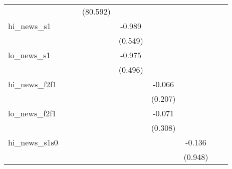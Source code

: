 {\begin{tabular}{l*{8}{c}}
            &                     &                     &    (80.592)         &                     &                     &                     &                     &                     \\
\addlinespace
hi\_news\_s1  &                     &                     &                     &      -0.989\sym{*}  &                     &                     &                     &                     \\
            &                     &                     &                     &     (0.549)         &                     &                     &                     &                     \\
\addlinespace
lo\_news\_s1  &                     &                     &                     &      -0.975\sym{**} &                     &                     &                     &                     \\
            &                     &                     &                     &     (0.496)         &                     &                     &                     &                     \\
\addlinespace
hi\_news\_f2f1&                     &                     &                     &                     &      -0.066         &                     &                     &                     \\
            &                     &                     &                     &                     &     (0.207)         &                     &                     &                     \\
\addlinespace
lo\_news\_f2f1&                     &                     &                     &                     &      -0.071         &                     &                     &                     \\
            &                     &                     &                     &                     &     (0.308)         &                     &                     &                     \\
\addlinespace
hi\_news\_s1s0&                     &                     &                     &                     &                     &      -0.136         &                     &                     \\
            &                     &                     &                     &                     &                     &     (0.948)         &                     &                     \\

\end{tabular}}
